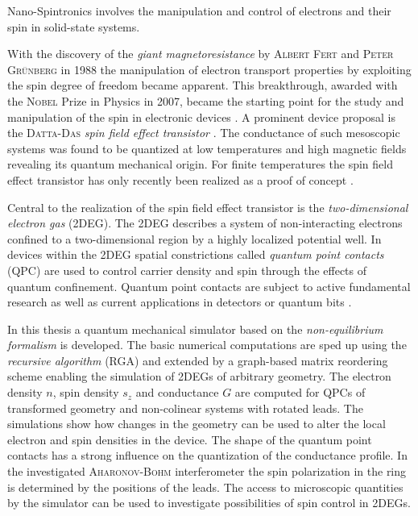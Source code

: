 Nano-Spintronics involves the manipulation and control of electrons and their spin in solid-state systems.\par
With the discovery of the \emph{giant magnetoresistance} by \textsc{Albert Fert} and \textsc{Peter Gr\"unberg} in 1988 the manipulation of electron transport properties by exploiting the spin degree of freedom became apparent. This breakthrough, awarded with the \textsc{Nobel} Prize in Physics in 2007, became the starting point for the study and manipulation of the spin in electronic devices \cite{evegeny2010spin}. A prominent device proposal is the \textsc{Datta-Das} \emph{spin field effect transistor} \cite{datta:665}. The conductance of such mesoscopic systems was found to be quantized \cite{PhysRevLett.45.494} at low temperatures and high magnetic fields revealing its quantum mechanical origin. For finite temperatures the spin field effect transistor has only recently been realized as a proof of concept \cite{Wunderlich24122010}.\par
Central to the realization of the spin field effect transistor is the \emph{two-dimensional electron gas} (2DEG). The 2DEG describes a system of non-interacting electrons confined to a two-dimensional region by a highly localized potential well. In devices within the 2DEG spatial constrictions called \emph{quantum point contacts} (QPC) are used to control carrier density and spin through the effects of quantum confinement. Quantum point contacts are subject to active fundamental research as well as current applications in detectors \cite{PhysRevB.67.161308} or quantum bits \cite{PhysRevA.57.120}.\par
In this thesis a quantum mechanical simulator based on the \emph{non-equilibrium \gfnc{} formalism} is developed. The basic numerical computations are sped up using the \emph{recursive \gfnc{} algorithm} (RGA) and extended by a graph-based matrix reordering scheme enabling the simulation of 2DEGs of arbitrary geometry.
The electron density $n$, spin density $s_z$ and conductance $G$ are computed for QPCs of transformed geometry and non-colinear systems with rotated leads. The simulations show how changes in the geometry can be used to alter the local electron and spin densities in the device.
The shape of the quantum point contacts has a strong influence on the quantization of the conductance profile. In the investigated \textsc{Aharonov-Bohm} interferometer the spin polarization in the ring is determined by the positions of the leads. The access to microscopic quantities by the simulator can be used to investigate possibilities of spin control in 2DEGs.
